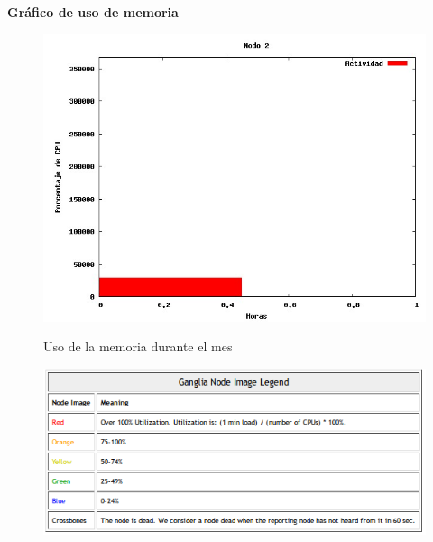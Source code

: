 \documentclass[11pt,a4paper,oneside,openany]{report}
\begin{document}
\textbf{Gráfico de uso de memoria}
\begin{figure}[htb]
\centering
\includegraphics[width=0.9\linewidth]{memoria1.jpg}\\
\caption{Uso de la memoria durante el mes}
\end{figure}

\begin{figure}[htb]
\centering
\includegraphics[width=0.9\linewidth]{legend}\\
\end{figure}

\end{document}
